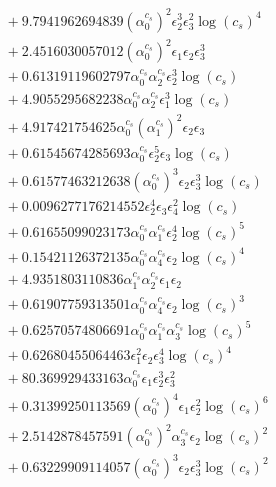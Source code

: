 \documentclass[10pt]{article}
\begin{document}
\begin{align*}
&{}  + 9.7941962694839 \left(\alpha_{0}^{c_s}\right)^{2} \epsilon_{2}^{3} \epsilon_{3}^{2} \log{\left(c_{s} \right)}^{4} \\
&{}  + 2.4516030057012 \left(\alpha_{0}^{c_s}\right)^{2} \epsilon_{1} \epsilon_{2} \epsilon_{3}^{3} \\
&{}  + 0.61319119602797 \alpha_{0}^{c_s} \alpha_{2}^{c_s} \epsilon_{2}^{3} \log{\left(c_{s} \right)} \\
&{}  + 4.9055295682238 \alpha_{0}^{c_s} \alpha_{2}^{c_s} \epsilon_{1}^{3} \log{\left(c_{s} \right)} \\
&{}  + 4.917421754625 \alpha_{0}^{c_s} \left(\alpha_{1}^{c_s}\right)^{2} \epsilon_{2} \epsilon_{3} \\
&{}  + 0.61545674285693 \alpha_{0}^{c_s} \epsilon_{2}^{5} \epsilon_{3} \log{\left(c_{s} \right)} \\
&{}  + 0.61577463212638 \left(\alpha_{0}^{c_s}\right)^{3} \epsilon_{2} \epsilon_{3}^{3} \log{\left(c_{s} \right)} \\
&{}  + 0.0096277176214552 \epsilon_{2}^{4} \epsilon_{3} \epsilon_{4}^{2} \log{\left(c_{s} \right)} \\
&{}  + 0.61655099023173 \alpha_{0}^{c_s} \alpha_{1}^{c_s} \epsilon_{2}^{4} \log{\left(c_{s} \right)}^{5} \\
&{}  + 0.15421126372135 \alpha_{0}^{c_s} \alpha_{4}^{c_s} \epsilon_{2} \log{\left(c_{s} \right)}^{4} \\
&{}  + 4.9351803110836 \alpha_{1}^{c_s} \alpha_{2}^{c_s} \epsilon_{1} \epsilon_{2} \\
&{}  + 0.61907759313501 \alpha_{0}^{c_s} \alpha_{4}^{c_s} \epsilon_{2} \log{\left(c_{s} \right)}^{3} \\
&{}  + 0.62570574806691 \alpha_{0}^{c_s} \alpha_{1}^{c_s} \alpha_{3}^{c_s} \log{\left(c_{s} \right)}^{5} \\
&{}  + 0.62680455064463 \epsilon_{1}^{2} \epsilon_{2} \epsilon_{3}^{4} \log{\left(c_{s} \right)}^{4} \\
&{}  + 80.369929433163 \alpha_{0}^{c_s} \epsilon_{1} \epsilon_{2}^{3} \epsilon_{3}^{2} \\
&{}  + 0.31399250113569 \left(\alpha_{0}^{c_s}\right)^{4} \epsilon_{1} \epsilon_{2}^{2} \log{\left(c_{s} \right)}^{6} \\
&{}  + 2.5142878457591 \left(\alpha_{0}^{c_s}\right)^{2} \alpha_{3}^{c_s} \epsilon_{2} \log{\left(c_{s} \right)}^{2} \\
&{}  + 0.63229909114057 \left(\alpha_{0}^{c_s}\right)^{3} \epsilon_{2} \epsilon_{3}^{3} \log{\left(c_{s} \right)}^{2} \\

\end{align*}
\end{document}
